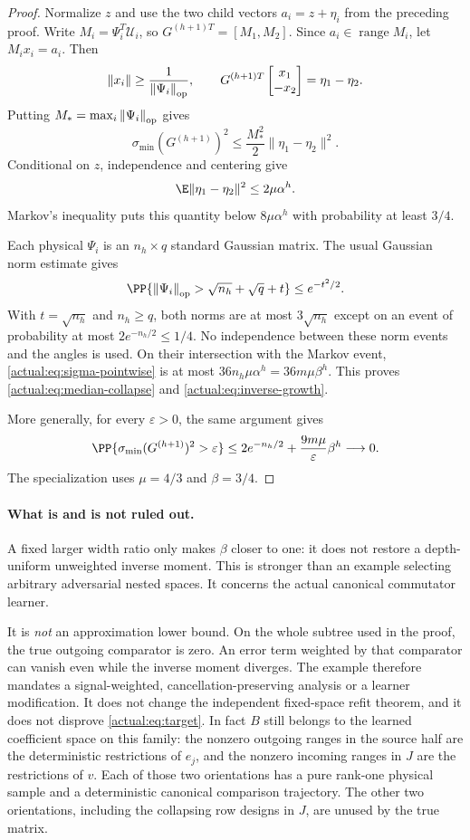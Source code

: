 \documentclass[11pt,oneside,openany,a4paper]{book}
\numberwithin{equation}{chapter}
\theoremstyle{definition}
\theoremstyle{remark}
\newcommand{\op}[1]{\left\lVert#1\right\rVert_{\rm op}}
\DeclareMathOperator{\ran}{range}\DeclareMathOperator{\OPT}{OPT}
\begin{document}
\begin{proof}
Normalize $z$ and use the two child vectors $a_i=z+\eta_i$ from the preceding proof. Write $M_i=\Psi_i^T\mathcal U_i$, so
$G^{(h+1)T}=[M_1,M_2]$. Since $a_i\in\ran M_i$, let $M_ix_i=a_i$. Then
\[
 \|x_i\|\ge\frac1{\op{\Psi_i}},\qquad
 G^{(h+1)T}\begin{bmatrix}x_1\\-x_2\end{bmatrix}
       =\eta_1-\eta_2.
\]
Putting $M_* = \max_i\op{\Psi_i}$ gives
\begin{equation}\label{actual:eq:sigma-pointwise}
 \sigma_{\min}(G^{(h+1)})^2
       \le\frac{M_*^2}{2}\|\eta_1-\eta_2\|^2.
\end{equation}
Conditional on $z$, independence and centering give
\[
 \E\|\eta_1-\eta_2\|^2\le2\mu\alpha^h.
\]
Markov's inequality puts this quantity below $8\mu\alpha^h$ with probability at least $3/4$.

Each physical $\Psi_i$ is an $n_h\times q$ standard Gaussian matrix. The usual Gaussian norm estimate \cite{HMT} gives
\[
 \PP\{\op{\Psi_i}>\sqrt{n_h}+\sqrt q+t\}\le e^{-t^2/2}.
\]
With $t=\sqrt{n_h}$ and $n_h\ge q$, both norms are at most $3\sqrt{n_h}$ except on an event of probability at most $2e^{-n_h/2}\le1/4$. No independence between these norm events and the angles is used. On their intersection with the Markov event, \eqref{actual:eq:sigma-pointwise} is at most
$36n_h\mu\alpha^h=36m\mu\beta^h$. This proves \eqref{actual:eq:median-collapse} and \eqref{actual:eq:inverse-growth}.

More generally, for every $\varepsilon>0$, the same argument gives
\[
 \PP\{\sigma_{\min}(G^{(h+1)})^2>\varepsilon\}
 \le2e^{-n_h/2}+\frac{9m\mu}{\varepsilon}\beta^h\longrightarrow0.
\]
The specialization uses $\mu=4/3$ and $\beta=3/4$.
\end{proof}

\paragraph{What is and is not ruled out.}
A fixed larger width ratio only makes $\beta$ closer to one: it does not restore a depth-uniform unweighted inverse moment. This is stronger than an example selecting arbitrary adversarial nested spaces. It concerns the actual canonical commutator learner.

It is \emph{not} an approximation lower bound. On the whole subtree used in the proof, the true outgoing comparator is zero. An error term weighted by that comparator can vanish even while the inverse moment diverges. The example therefore mandates a signal-weighted, cancellation-preserving analysis or a learner modification. It does not change the independent fixed-space refit theorem, and it does not disprove \eqref{actual:eq:target}. In fact $B$ still belongs to the learned coefficient space on this family: the nonzero outgoing ranges in the source half are the deterministic restrictions of $e_j$, and the nonzero incoming ranges in $J$ are the restrictions of $v$. Each of those two orientations has a pure rank-one physical sample and a deterministic canonical comparison trajectory. The other two orientations, including the collapsing row designs in $J$, are unused by the true matrix.
\end{document}

